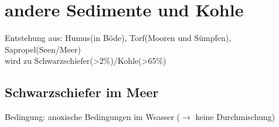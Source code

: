 \documentclass[a4,12pt]{scrreprt}
\begin{document}
\section{andere Sedimente und Kohle}
Entstehung aus: Humus(in Böde), Torf(Mooren und Sümpfen), Sapropel(Seen/Meer)\\
wird zu Schwarzschiefer(>2\%)/Kohle(>65\%)\\

\subsection{Schwarzschiefer im Meer}
Bedingung: anoxische Bedingungen im Wsasser ($\rightarrow$ keine Durchmischung)
\end{document}
